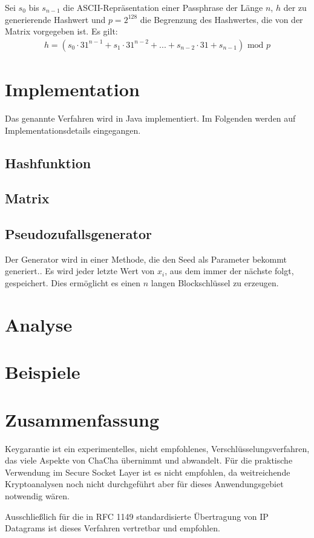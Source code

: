\documentclass[10pt,a4paper]{article}
\begin{document}
Sei $s_0$ bis $s_{n-1}$ die ASCII-Repräsentation einer Passphrase der Länge $n$, $h$ der zu generierende Hashwert und $p = 2^{128}$ die Begrenzung des Hashwertes, die von der Matrix vorgegeben ist.
Es gilt:
\begin{align*}
    h = \left( s_0 \cdot 31^{n-1} + s_1 \cdot 31^{n-2} + ... + s_{n-2} \cdot 31 + s_{n-1}\right)\text{ mod } p
\end{align*}

\section{Implementation}

Das genannte Verfahren wird in Java implementiert.
Im Folgenden werden auf Implementationsdetails eingegangen.

\subsection{Hashfunktion}

\subsection{Matrix}

\subsection{Pseudozufallsgenerator}

Der Generator wird in einer Methode, die den Seed als Parameter bekommt generiert..
Es wird jeder letzte Wert von $x_i$, aus dem immer der nächste folgt, gespeichert. Dies ermöglicht es einen $n$ langen Blockschlüssel zu erzeugen.

\section{Analyse}

\section{Beispiele}

\section{Zusammenfassung}

Keygarantie ist ein experimentelles, nicht empfohlenes, Verschlüsselungsverfahren, das viele Aspekte von ChaCha übernimmt und abwandelt.
Für die praktische Verwendung im Secure Socket Layer ist es nicht empfohlen, da weitreichende Kryptoanalysen noch nicht durchgeführt aber für dieses Anwendungsgebiet notwendig wären.

Ausschließlich für die in RFC 1149 standardisierte Übertragung von IP Datagrams\cite{Waitzman1990} ist dieses Verfahren vertretbar und empfohlen.

{}

\end{document}
